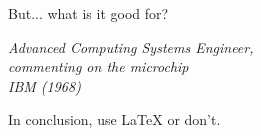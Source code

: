 \singlespacing
\epigraph{But... what is it good for?}{\textit{Advanced Computing Systems Engineer, \\ commenting on the microchip\\ IBM (1968)}}
\doublespace

In conclusion, use LaTeX or don't. 